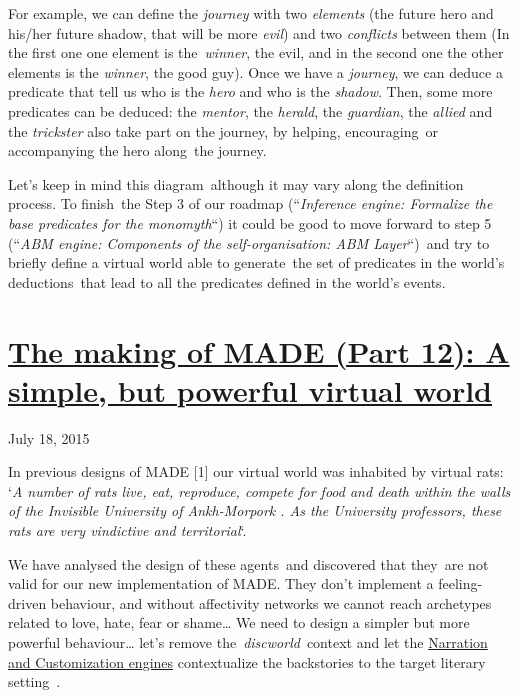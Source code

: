 \documentclass[a4paper]{article}
\newcommand\textstyleEmphasis[1]{\textit{#1}}
\begin{document}
For example, we can define the \textstyleEmphasis{journey} with two
\textstyleEmphasis{elements} (the future hero and his/her future
shadow, that will be more \textstyleEmphasis{evil}) and two
\textstyleEmphasis{conflicts} between them (In the first one one
element is the~\textstyleEmphasis{winner}, the evil, and in the second
one the other elements is the \textstyleEmphasis{winner}, the good
guy). Once we have a \textstyleEmphasis{journey}, we can deduce a
predicate that tell us who is the \textstyleEmphasis{hero} and who is
the \textstyleEmphasis{shadow}. Then, some more predicates can be
deduced: the \textstyleEmphasis{mentor}, the
\textstyleEmphasis{herald}, the \textstyleEmphasis{guardian}, the
\textstyleEmphasis{allied} and the \textstyleEmphasis{trickster} also
take part on the journey, by helping, encouraging~or accompanying the
hero along~the journey.

Let{\textquoteright}s keep in mind this diagram~although it may vary
along the definition process. To finish~the Step 3 of our roadmap
({\textquotedblleft}\textstyleEmphasis{Inference engine: Formalize the
base predicates for the monomyth}{\textquotedblleft}) it could be good
to move forward to step 5 ({\textquotedblleft}\textstyleEmphasis{ABM
engine: Components of the self-organisation: ABM
Layer}{\textquotedblleft})~and try to briefly define a virtual world
able to generate~the set of predicates in the world{\textquoteright}s
deductions~that lead to all the predicates defined in the
world{\textquoteright}s events.


\bigskip

\clearpage\section[The making of MADE (Part 12): A simple, but powerful
virtual
world]{\href{http://www.velonuboso.com/made/2015/07/18/making-part-12-simple-powerful-virtual-world/}{The
making of MADE (Part 12): A simple, but powerful virtual world}}
July 18, 2015

In previous designs of MADE [1] our virtual world was inhabited by
virtual rats: {\textquoteleft}\textstyleEmphasis{A number of rats live,
eat, reproduce, compete for food and death within the walls of the
Invisible University of Ankh-Morpork . As the University professors,
these rats are very vindictive and territorial}{\textquoteleft}.

We have analysed the design of these agents~and discovered that they~are
not valid for our new implementation of MADE. They
don{\textquoteright}t implement a feeling-driven behaviour, and without
affectivity networks we cannot reach archetypes related to love, hate,
fear or shame{\dots} We need to design a simpler but more powerful
behaviour{\dots} let{\textquoteright}s remove
the~\textstyleEmphasis{discworld}~context and let the
\href{http://www.velonuboso.com/made/2015/06/27/making-part-8-component-stack-dataflow/}{Narration
and Customization engines} contextualize the backstories to the target
literary setting~.
\end{document}
